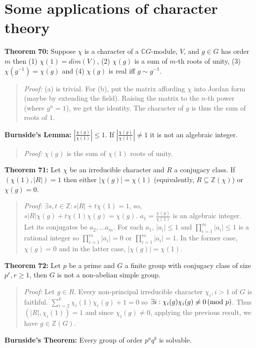 {\section {Some applications of character theory}
{\bf Theorem 70:}
Suppose $\chi$ is a character of a ${\mathbb C}G$-module, $V$, and $g \in G$ has order
$m$ then (1) $\chi(1)=dim(V)$, (2) $\chi(g)$ is a sum of $m$-th roots of unity,
(3) $\chi(g^{-1})= {\overline {\chi(g)}}$ and (4) $\chi(g)$ is real iff $g \sim g^{-1}$.
\begin{quote}
\emph{Proof:}  
(a) is trivial.
For (b), put the matrix affording $\chi$ into Jordan form (maybe by extending the field).  Raising
the matrix to the $n$-th power (where $g^n = 1$), we get the identity.  The character of $g$ is thus
the sum of roots of $1$.
\end{quote}
{\bf Burnside's Lemma:} 
$|{\frac {\chi(g)} {\chi(1)}}| \le 1$.  If
$|{\frac {\chi(g)} {\chi(1)}}| \ne 1$ it is not an algebraic integer.  
\begin{quote}
\emph{Proof:}  
$\chi(g)$ is the sum of $\chi(1)$ roots of unity.
\end{quote}
{\bf Theorem 71:}
Let $\chi$ be an irreducible character and $R$ a conjugacy class.
If $(\chi(1), |R|)=1$ then either $|\chi(g)|= \chi(1)$ (equivalently, 
$R \subseteq {\mathbb Z}(\chi)$) or $\chi(g)=0$.
\begin{quote}
\emph{Proof:}  
$\exists s, t \in {\mathbb Z}: s|R|+ t \chi(1) =1$, so,
$s|R| \chi(g) + t \chi(1) \chi(g)  = \chi(g)$.  
$a_1= {\frac {\chi(g)} {\chi(1)}}$ is an algebraic integer.  Let its
conjugates be $a_2 , \ldots a_m$.  For each $a_1$, $|a_i| \le 1$ and
$\prod_{i=1}^m |a_i| \le 1$ is a rational integer so
$\prod_{i=1}^m |a_i| = 0$ or
$\prod_{i=1}^m |a_i| = 1$.  In the former case, $\chi(g)= 0$ and in the latter
case, $|\chi(g)|= \chi(1)$.
\end{quote}
{\bf Theorem 72:}
Let $p$ be a prime and $G$ a finite
group with conjugacy class of size $p^r, r \ge 1$, then $G$ is not a non-abelian simple group.
\begin{quote}
\emph{Proof:}  
Let $g \in R$.  Every non-principal irreducible character $\chi_i, i>1$ of $G$ is faithful.
$\sum_{i=2}^k \chi_i(1) \chi_i(g) + 1 = 0$ so $\exists i: \chi_i(g) \chi_i(g) \ne 0 \thinspace \textnormal{(mod } p \textnormal{)}$.
Thus $(|R|, \chi_i(1)) =1$ and since $\chi_i(g) \ne 0$, applying the previous result,
we have $g \in {\mathbb Z}(G)$.
\end{quote}
{\bf Burnside's Theorem:} Every group of order $p^a q^b$ is solvable.
\begin{quote}

\end{quote}}
